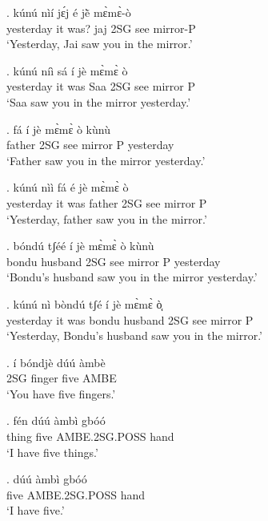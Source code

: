 \documentclass{assets/fieldnotes}
\begin{document}
\exg. kúnú nìí jɛ́j é jẽ̀ mɛ̀mɛ̀-ò \\
yesterday {it was?} jaj 2SG see mirror-P \\
`Yesterday, Jai saw you in the mirror.'


\exg. kúnú níì sá í jè mɛ̀mɛ̀ ò \\
yesterday {it was} Saa 2SG see mirror P \\
`Saa saw you in the mirror yesterday.'

\exg. fá í jè mɛ̀mɛ̀ ò kùnù \\
father 2SG see mirror P yesterday \\
`Father saw you in the mirror yesterday.'

\exg. kúnú nìì fá é jè mɛ̀mɛ̀ ò \\
yesterday {it was} father 2SG see mirror P \\
`Yesterday, father saw you in the mirror.'

\exg. bóndú tʃéé í jè mɛ̀mɛ̀ ò kùnù \\ %
bondu husband 2SG see mirror P yesterday \\
`Bondu's husband saw you in the mirror yesterday.'

\exg. kúnú nì bòndú tʃé í jè mɛ̀mɛ̀ ò̜̜ \\
yesterday {it was} bondu husband 2SG see mirror P \\
`Yesterday, Bondu's husband saw you in the mirror.'

\exg. í bóndjè dúú àmbè \\
2SG finger five AMBE \\
`You have five fingers.'

\exg. fén dúú àmbì gbóó \\
thing five AMBE.2SG.POSS hand \\
`I have five things.' 


\exg. dúú àmbì gbóó \\
five AMBE.2SG.POSS hand \\
`I have five.'


 
\end{document}

